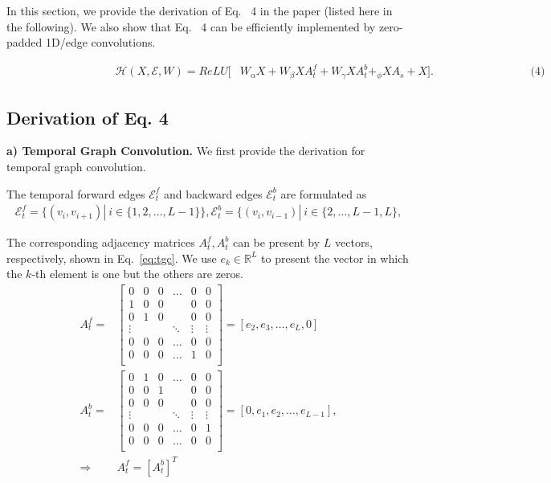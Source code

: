 \documentclass[10pt,twocolumn,letterpaper]{article}
\newcommand{\E}{\mathcal{E}}
\renewcommand{\H}{\mathcal{H}}
\begin{document}
In this section, we provide the derivation of Eq.~{\color{red} 4} in the paper (listed here in the following). We also show that Eq.~{\color{red} 4} can be  efficiently implemented by zero-padded 1D/edge convolutions. \newline

\begin{align} \label{eq:block2}
   ~~~~~~~~~~~~~~~~~~~~~~~~~~~~~~~~~~~~~~~~~~\H(X,\E,W)=ReLU[&W_\alpha X + W_\beta X A_t^f + W_\gamma X A_t^b+ _\phi X A_s+X]. ~~~~~~~~~~~~~~~~~~~~~~~~~~~~~~~~~~~~~~~ \textrm{(4)}\nonumber
\end{align}



\noindent
\subsection{Derivation of Eq. 4}





\noindent
\textbf{a) Temporal Graph Convolution.} We first provide the derivation for temporal graph convolution.

The temporal forward edges $\mathcal{E}_t^f$ and backward edges $\mathcal{E}_t^b$ are formulated as
\begin{align} 
    \mathcal{E}_t^f=\{(v_i,v_{i+1})|~i\in\{1,2,\dots,L-1\}\} , \mathcal{E}_t^b=\{(v_i,v_{i-1})|~i\in\{2,\dots,L-1,L\},
\end{align}

The corresponding adjacency matrices $A_t^f, A_t^b$ can be present by $L$ vectors, respectively, shown in Eq.~\ref{eq:tgc}. We use $e_k\in \mathbb{R}^{L}$ to present the vector in which the $k$-th element is one but the others are zeros. 
\begin{align} \label{eq:tgc}
    A_t^f = &
        \begin{bmatrix}
        0 & 0 & 0 & \dots & 0 & 0 \\
        1 & 0 & 0 &   & 0 & 0 \\
        0 & 1 & 0 &  & 0 & 0 \\
        \vdots&  &  & \ddots & \vdots & \vdots \\
         0 & 0 & 0 & \dots & 0 & 0 \\
        0 & 0 & 0 & \dots & 1 & 0 \\
        \end{bmatrix} 
    = [e_2,e_3,\dots, e_L, 0] \nonumber\\
    A_t^b = &
        \begin{bmatrix}
        0 & 1 & 0 & \dots& 0 & 0 \\
        0 & 0 & 1 &   & 0 & 0 \\
        0 & 0 & 0 &  & 0 & 0 \\
         \vdots&  &  & \ddots & \vdots & \vdots \\
          0 & 0 & 0 & \dots & 0 & 1 \\
        0 & 0 & 0 & \dots & 0 & 0 \\
        \end{bmatrix}    
    = [0, e_1, e_2,\dots, e_{L-1}], \nonumber\\
    \Rightarrow & A_t^f = [A_t^b]^T
\end{align}
\end{document}
